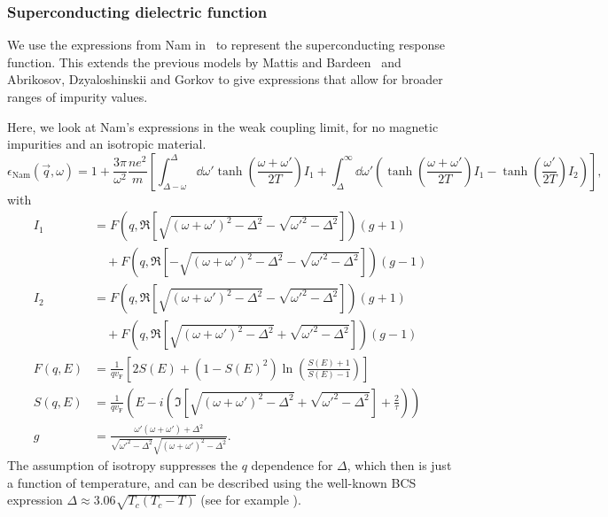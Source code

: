 \documentclass[%
 preprint,
 amsmath,amssymb,
 aps,
]{revtex4-2}
\newcommand{\vf}{v_{\mathrm{F}}}
\begin{document}
\subsubsection{Superconducting dielectric function} \label{subsubsec:namdielectric}
We use the expressions from Nam in~\cite{Nam1967} to represent the superconducting response function.
This extends the previous models by Mattis and Bardeen~\cite{Mattis} and Abrikosov, Dzyaloshinskii and Gorkov\cite{AGD} to give expressions that allow for broader ranges of impurity values.

Here, we look at Nam's expressions in the weak coupling limit, for no magnetic impurities and an isotropic material.
\begin{equation}
	\epsilon_{\mathrm{Nam}}(\vec{q}, \omega) = 1 + \frac{3 \pi}{\omega^2} \frac{n e^2}{m} \left[\int_{\Delta - \omega}^{\Delta}\dd{\omega'} \tanh(\frac{\omega + \omega'}{2 T}) I_1 + \int_{\Delta}^{\infty} \dd{\omega'} \left( \tanh(\frac{\omega + \omega'}{2 T}) I_1  - \tanh(\frac{\omega'}{2 T})I_2 \right) \right], \label{eq:eps}
\end{equation}
with
\begin{align}
	I_1 &= F(q, \Re[\sqrt{(\omega + \omega')^2 - \Delta^2} - \sqrt{\omega'^2 - \Delta^2}]) (g + 1) \nonumber\\
	&\quad + F(q, \Re[-\sqrt{(\omega + \omega')^2 - \Delta^2} - \sqrt{\omega'^2 - \Delta^2}]) (g - 1) \\
	I_2 &= F(q, \Re[\sqrt{(\omega + \omega')^2 - \Delta^2} - \sqrt{\omega'^2 - \Delta^2}]) (g + 1) \nonumber\\
	&\quad + F(q, \Re[\sqrt{(\omega +  \omega')^2 - \Delta^2} + \sqrt{\omega'^2 - \Delta^2}]) (g - 1) \\
	F(q, E) &= \frac{1}{q \vf} \left[2 S(E) + (1 - S(E)^2)\ln(\frac{S(E) + 1}{S(E) - 1})\right] \label{eq:NamF} \\
	S(q, E) &= \frac{1}{q \vf} \left( E - i \left(\Im[\sqrt{(\omega + \omega')^2 - \Delta^2} + \sqrt{\omega'^2 - \Delta^2}] + \frac{2}{\tau} \right) \right) \\
	g &= \frac{\omega' \left(\omega + \omega'\right) + \Delta^2}{\sqrt{\omega'^2 - \Delta^2}\sqrt{(\omega + \omega')^2 - \Delta^2}}.
\end{align}
The assumption of isotropy suppresses the $q$ dependence for $\Delta$, which then is just a function of temperature, and can be described using the well-known BCS expression $\Delta \approx 3.06 \sqrt{T_c(T_c - T)}$ (see for example \cite{Tinkham}).
\end{document}
